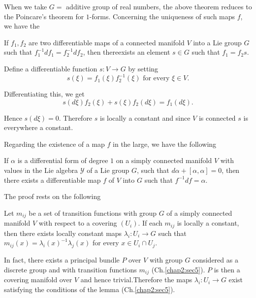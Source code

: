 \begin{remark*}%
  When we take $G =$ additive group of real numbers, the above theorem
  reduces to the Poincare's theorem for $1$-forms. Concerning the
  uniqueness of such maps $f$, we have the  
\end{remark*}

  \begin{proposition}\label{chap3:sec5:prop2}%
    If $f_1, f_2$ are two differentiable maps of a connected manifold
    $V$ into a Lie group $G$ such that $f^{-1}_1 df_1 = f^{-1}_2
    df_2$, then there\pageoriginale exists an element $s \in G $ such
    that $f_1 = f_2 s$. 
  \end{proposition}

Define a differentiable function $s : V \rightarrow G$ by setting
$$
s(\xi) = f_1 (\xi) f^{-1}_2 (\xi) \text{ for every } \xi \in V.
$$

Differentiating this, we get 
$$
s(d \xi) f_2 (\xi) + s (\xi) f_2 (d \xi) = f_1 (d \xi).
$$

Hence $s(d \xi) = 0$. Therefore $s$ is locally a constant and since
$V$ is connected $s$ is everywhere a constant. 

Regarding the existence of a map $f$ in the large, we have the following

\begin{theorem}\label{chap3:sec5:thm4}
  If $\alpha$ is a differential form of degree $1$ on a simply
  connected manifold $V$ with values in the Lie algebra $\mathscr{Y}$
  of a Lie group $G$, such that $d \alpha + [\alpha, \alpha] = 0$,
  then there exists a differentiable map $f$ of $V$ into $G$ such that
  $f^{-1} df = \alpha$. 
\end{theorem}

The proof rests on the following
\begin{lem}\label{chap3:sec5:lem2}%
  Let $m_{ij}$ be a set of transition functions with group $G$ of a
  simply connected manifold $V$ with respect to a covering $(U_i)$. If
  each $m_{ij}$ is locally a constant, then there exists locally
  constant maps $\lambda_i : U_i \rightarrow G$ such that $m_{ij}(x) =
  \lambda_i (x)^{-1} \lambda_j (x)$ for every $x \in U_i \cap U_j$. 
\end{lem}

In fact, there exists a principal bundle $P$ over $V$ with group $G$
considered as a discrete group and with transition functions $m_{ij}$
(Ch.\ref{chap2:sec5}). $P$ is then a covering manifold over $V$ and hence
trivial.\pageoriginale Therefore the maps $\lambda_i : U_i \rightarrow G$ exist
satisfying the conditions of the lemma (Ch.\ref{chap2:sec5}). 

